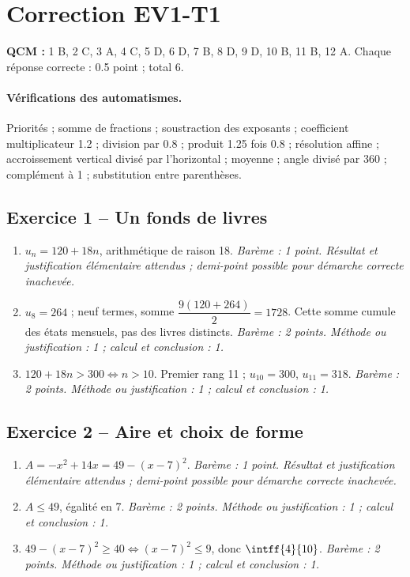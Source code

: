 \mxnewpage\section*{Correction EV1-T1}\label{EV1-T1-CORR}
\textbf{QCM :} 1 B, 2 C, 3 A, 4 C, 5 D, 6 D, 7 B, 8 D, 9 D, 10 B, 11 B, 12 A. Chaque réponse correcte : \num{0,5} point ; total 6.
\paragraph{Vérifications des automatismes.} Priorités ; somme de fractions ; soustraction des exposants ; coefficient multiplicateur \num{1,2} ; division par \num{0,8} ; produit \num{1,25} fois \num{0,8} ; résolution affine ; accroissement vertical divisé par l’horizontal ; moyenne ; angle divisé par 360 ; complément à 1 ; substitution entre parenthèses.
\subsection*{Exercice 1 -- Un fonds de livres}
\begin{enumerate}
\item $u_n=120+18n$, arithmétique de raison 18. \textit{Barème : 1 point. Résultat et justification élémentaire attendus ; demi-point possible pour démarche correcte inachevée.}
\item $u_8=264$ ; neuf termes, somme $\dfrac{9(120+264)}{2}=1728$. Cette somme cumule des états mensuels, pas des livres distincts. \textit{Barème : 2 points. Méthode ou justification : 1 ; calcul et conclusion : 1.}
\item $120+18n>300\iff n>10$. Premier rang 11 ; $u_{10}=300$, $u_{11}=318$. \textit{Barème : 2 points. Méthode ou justification : 1 ; calcul et conclusion : 1.}
\end{enumerate}
\subsection*{Exercice 2 -- Aire et choix de forme}
\begin{enumerate}
\item $A=-x^2+14x=49-(x-7)^2$. \textit{Barème : 1 point. Résultat et justification élémentaire attendus ; demi-point possible pour démarche correcte inachevée.}
\item $A\leq49$, égalité en 7. \textit{Barème : 2 points. Méthode ou justification : 1 ; calcul et conclusion : 1.}
\item $49-(x-7)^2\geq40\iff(x-7)^2\leq9$, donc $\intff{4}{10}$. \textit{Barème : 2 points. Méthode ou justification : 1 ; calcul et conclusion : 1.}
\end{enumerate}

